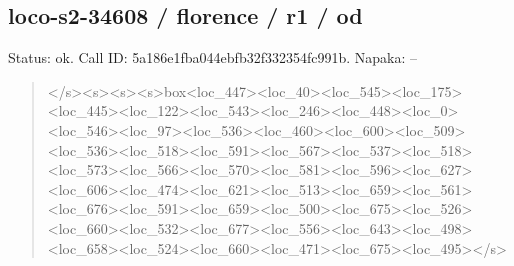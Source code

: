 \documentclass[10pt,a4paper]{article}
\begin{document}
\subsection*{loco-s2-34608 / florence / r1 / od}
Status: ok. Call ID: 5a186e1fba044ebfb32f332354fc991b. Napaka: --
\begin{quote}\footnotesize
</s>\allowbreak{}<s>\allowbreak{}<s>\allowbreak{}<s>\allowbreak{}box<loc\_447>\allowbreak{}<loc\_40\allowbreak{}>\allowbreak{}<loc\_545>\allowbreak{}<loc\_175>\allowbreak{}<loc\_445>\allowbreak{}<loc\allowbreak{}\_122>\allowbreak{}<loc\_543>\allowbreak{}<loc\_246>\allowbreak{}<loc\_448>\allowbreak{}\allowbreak{}<loc\_0>\allowbreak{}<loc\_546>\allowbreak{}<loc\_97>\allowbreak{}<loc\_536\allowbreak{}>\allowbreak{}<loc\_460>\allowbreak{}<loc\_600>\allowbreak{}<loc\_509>\allowbreak{}<loc\allowbreak{}\_536>\allowbreak{}<loc\_518>\allowbreak{}<loc\_591>\allowbreak{}<loc\_567>\allowbreak{}\allowbreak{}<loc\_537>\allowbreak{}<loc\_518>\allowbreak{}<loc\_573>\allowbreak{}<loc\_\allowbreak{}566>\allowbreak{}<loc\_570>\allowbreak{}<loc\_581>\allowbreak{}<loc\_596>\allowbreak{}<\allowbreak{}loc\_627>\allowbreak{}<loc\_606>\allowbreak{}<loc\_474>\allowbreak{}<loc\_6\allowbreak{}21>\allowbreak{}<loc\_513>\allowbreak{}<loc\_659>\allowbreak{}<loc\_561>\allowbreak{}<l\allowbreak{}oc\_676>\allowbreak{}<loc\_591>\allowbreak{}<loc\_659>\allowbreak{}<loc\_50\allowbreak{}0>\allowbreak{}<loc\_675>\allowbreak{}<loc\_526>\allowbreak{}<loc\_660>\allowbreak{}<lo\allowbreak{}c\_532>\allowbreak{}<loc\_677>\allowbreak{}<loc\_556>\allowbreak{}<loc\_643\allowbreak{}>\allowbreak{}<loc\_498>\allowbreak{}<loc\_658>\allowbreak{}<loc\_524>\allowbreak{}<loc\allowbreak{}\_660>\allowbreak{}<loc\_471>\allowbreak{}<loc\_675>\allowbreak{}<loc\_495>\allowbreak{}\allowbreak{}</s>\allowbreak{}
\end{quote}
\end{document}
